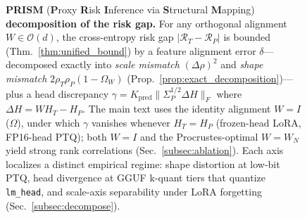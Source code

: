 \begin{figure}[t]
\caption{\textbf{PRISM} (\textbf{P}roxy \textbf{R}isk \textbf{I}nference via \textbf{S}tructural \textbf{M}apping) \textbf{decomposition of the risk gap.} For any orthogonal alignment $W \in \mathcal{O}(d)$, the cross-entropy risk gap $|\mathcal{R}_T{-}\mathcal{R}_P|$ is bounded (Thm.~\ref{thm:unified_bound}) by a feature alignment error $\delta$---decomposed exactly into \emph{scale mismatch} $(\Delta\rho)^{2}$ and \emph{shape mismatch} $2\rho_T\rho_P(1{-}\Omega_W)$ (Prop.~\ref{prop:exact_decomposition})---plus a head discrepancy $\gamma{=}K_{\mathrm{pred}}\|\Sigma_P^{1/2}\Delta H\|_F$ where $\Delta H{=}WH_T{-}H_P$. The main text uses the identity alignment $W{=}I$ ($\Omega$), under which $\gamma$ vanishes whenever $H_T{=}H_P$ (frozen-head LoRA, FP16-head PTQ); both $W{=}I$ and the Procrustes-optimal $W{=}W_N$ yield strong rank correlations (Sec.~\ref{subsec:ablation}). Each axis localizes a distinct empirical regime: shape distortion at low-bit PTQ, head divergence at GGUF k-quant tiers that quantize \texttt{lm\_head}, and scale-axis separability under LoRA forgetting (Sec.~\ref{subsec:decompose}).}
\label{fig:prism_concept}
\end{figure}

